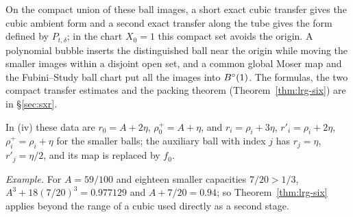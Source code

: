 On the compact union of these ball images, a short exact cubic transfer gives the cubic ambient form and a second
exact transfer along the tube gives the form defined by $P_{t,\delta}$; in the chart $X_0=1$ this compact set avoids
the origin. A polynomial bubble inserts the distinguished ball near the origin while moving the smaller images within
a disjoint open set, and a common global Moser map and the Fubini--Study ball chart put all the images into $B^{\circ}(1)$.
The formulas, the two compact transfer estimates and the packing theorem (Theorem~\ref{thm:lrg-six}) are in
\S\ref{sec:sxr}.

In (iv) these data are $r_0=A+2\eta$, $\rho_0^+=A+\eta$, and $r_i=\rho_i+3\eta$,
$r'_i=\rho_i+2\eta$, $\rho_i^+=\rho_i+\eta$ for the smaller balls; the auxiliary ball with index $j$ has $r_j=\eta$,
$r'_j=\eta/2$, and its map is replaced by $f_0$.

\emph{Example.} For $A=59/100$ and eighteen smaller capacities $7/20>1/3$, $A^3+18(7/20)^3=0.977129$ and
$A+7/20=0.94$; so Theorem~\ref{thm:lrg-six} applies beyond the range of a cubic used directly as a second stage.
